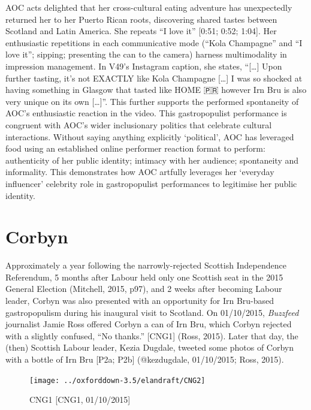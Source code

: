 \documentclass[a4paper, nobind]{templates/ociamthesis}
\begin{document}
AOC acts delighted that her cross-cultural eating adventure has unexpectedly returned her to her Puerto Rican roots, discovering shared tastes between Scotland and Latin America. She repeats ``I love it'' {[}0:51; 0:52; 1:04{]}. Her enthusiastic repetitions in each communicative mode (``Kola Champagne'' and ``I love it''; sipping; presenting the can to the camera) harness multimodality in impression management. In V49's Instagram caption, she states, ``{[}\ldots{]} Upon further tasting, it's not EXACTLY like Kola Champagne {[}\ldots{]} I was so shocked at having something in Glasgow that tasted like HOME 🇵🇷 however Irn Bru is also very unique on its own {[}\ldots{]}''. This further supports the performed spontaneity of AOC's enthusiastic reaction in the video. This gastropopulist performance is congruent with AOC's wider inclusionary politics that celebrate cultural interactions. Without saying anything explicitly `political', AOC has leveraged food using an established online performer reaction format to perform: authenticity of her public identity; intimacy with her audience; spontaneity and informality. This demonstrates how AOC artfully leverages her `everyday influencer' celebrity role in gastropopulist performances to legitimise her public identity.

\hypertarget{corbyn-2}{%
\section*{Corbyn}\label{corbyn-2}}

Approximately a year following the narrowly-rejected Scottish Independence Referendum, 5 months after Labour held only one Scottish seat in the 2015 General Election (Mitchell, 2015, p97), and 2 weeks after becoming Labour leader, Corbyn was also presented with an opportunity for Irn Bru-based gastropopulism during his inaugural visit to Scotland. On 01/10/2015, \emph{Buzzfeed} journalist Jamie Ross offered Corbyn a can of Irn Bru, which Corbyn rejected with a slightly confused, ``No thanks.'' {[}CNG1{]} (Ross, 2015). Later that day, the (then) Scottish Labour leader, Kezia Dugdale, tweeted some photos of Corbyn with a bottle of Irn Bru {[}P2a; P2b{]} (@kezdugdale, 01/10/2015; Ross, 2015).

\begin{figure}
\texttt{[image: ../oxforddown-3.5/elandraft/CNG2]} \caption{CNG1  [CNG1, 01/10/2015]}\label{fig:unnamed-chunk-30}
\end{figure}
\end{document}
